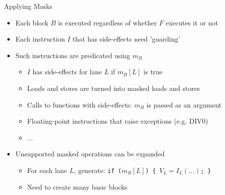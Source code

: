 
\begin{frame}{Applying Masks}

\begin{itemize}
    \item Each block $B$ is executed regardless of whether $F$ executes it or not
    \item Each instruction $I$ that has side-effects need 'guarding'
    \item Such instructions are predicated using $m_B$
    \begin{itemize}
        \item $I$ has side-effects for lane $L$ if $m_B[L]$ is true
        \item Loads and stores are turned into masked loads and stores
        \item Calls to functions with side-effects: $m_B$ is passed as an argument
        \item Floating-point instructions that raise exceptions (e.g. DIV0)
        \item ...
    \end{itemize}
    \item Unsupported masked operations can be expanded
    \begin{itemize}
        \item For each lane $L$, generate: \texttt{if ($m_B[L]$) \{ $V_L=I_L(...)$; \}}
        \item Need to create many basic blocks
    \end{itemize}
\end{itemize}

\end{frame}


